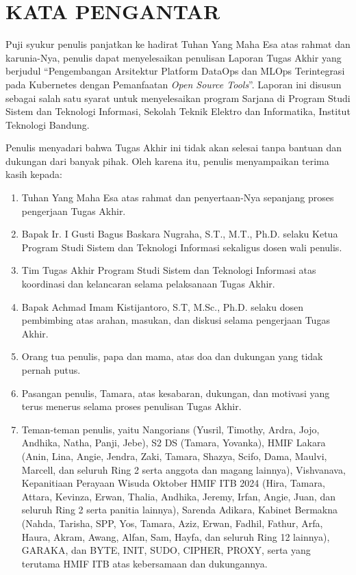 \chapter*{KATA PENGANTAR}

Puji syukur penulis panjatkan ke hadirat Tuhan Yang Maha Esa atas rahmat dan karunia-Nya, penulis dapat menyelesaikan penulisan Laporan Tugas Akhir yang berjudul ``Pengembangan Arsitektur Platform DataOps dan MLOps Terintegrasi pada Kubernetes dengan Pemanfaatan \textit{Open Source Tools}''. Laporan ini disusun sebagai salah satu syarat untuk menyelesaikan program Sarjana di Program Studi Sistem dan Teknologi Informasi, Sekolah Teknik Elektro dan Informatika, Institut Teknologi Bandung.

Penulis menyadari bahwa Tugas Akhir ini tidak akan selesai tanpa bantuan dan dukungan dari banyak pihak. Oleh karena itu, penulis menyampaikan terima kasih kepada:
\begin{enumerate}
    \item Tuhan Yang Maha Esa atas rahmat dan penyertaan-Nya sepanjang proses pengerjaan Tugas Akhir.
    \item Bapak Ir. I Gusti Bagus Baskara Nugraha, S.T., M.T., Ph.D. selaku Ketua Program Studi Sistem dan Teknologi Informasi sekaligus dosen wali penulis.
    \item Tim Tugas Akhir Program Studi Sistem dan Teknologi Informasi atas koordinasi dan kelancaran selama pelaksanaan Tugas Akhir.
    \item Bapak Achmad Imam Kistijantoro, S.T, M.Sc., Ph.D. selaku dosen pembimbing atas arahan, masukan, dan diskusi selama pengerjaan Tugas Akhir.
    \item Orang tua penulis, papa dan mama, atas doa dan dukungan yang tidak pernah putus.
    \item Pasangan penulis, Tamara, atas kesabaran, dukungan, dan motivasi yang terus menerus selama proses penulisan Tugas Akhir.
    \item Teman-teman penulis, yaitu Nangorians (Yusril, Timothy, Ardra, Jojo, Andhika, Natha, Panji, Jebe), S2 DS (Tamara, Yovanka), HMIF Lakara (Anin, Lina, Angie, Jendra, Zaki, Tamara, Shazya, Scifo, Dama, Maulvi, Marcell, dan seluruh Ring 2 serta anggota dan magang lainnya), Vishvanava, Kepanitiaan Perayaan Wisuda Oktober HMIF ITB 2024 (Hira, Tamara, Attara, Kevinza, Erwan, Thalia, Andhika, Jeremy, Irfan, Angie, Juan, dan seluruh Ring 2 serta panitia lainnya), Sarenda Adikara, Kabinet Bermakna (Nahda, Tarisha, SPP, Yos, Tamara, Aziz, Erwan, Fadhil, Fathur, Arfa, Haura, Akram, Awang, Alfan, Sam, Hayfa, dan seluruh Ring 12 lainnya), GARAKA, dan BYTE, INIT, SUDO, CIPHER, PROXY, serta yang terutama HMIF ITB atas kebersamaan dan dukungannya.
\end{enumerate}

